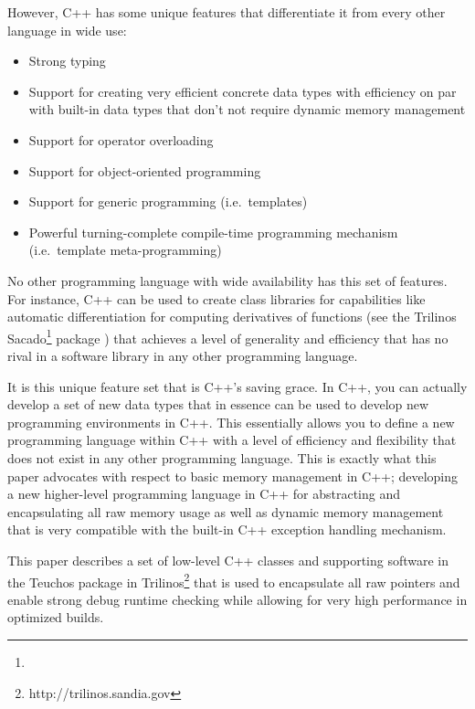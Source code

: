 \documentclass[pdf,ps2pdf,11pt]{SANDreport}
\begin{document}
However, C++ has some unique features that differentiate it from every
other language in wide use:

\begin{itemize}

{}\item Strong typing

{}\item Support for creating very efficient concrete data types with
efficiency on par with built-in data types that don't not require
dynamic memory management

{}\item Support for operator overloading

{}\item Support for object-oriented programming

{}\item Support for generic programming (i.e.\ templates)

{}\item Powerful turning-complete compile-time programming mechanism
(i.e.\ template meta-programming)

\end{itemize}

No other programming language with wide availability has this set of
features.  For instance, C++ can be used to create class libraries for
capabilities like automatic differentiation {}\cite{ref:ad} for
computing derivatives of functions (see the Trilinos
Sacado\footnote{}
package {}\cite{phippsEtAl2006}) that achieves a level of generality
and efficiency that has no rival in a software library in any other
programming language.

It is this unique feature set that is C++'s saving grace.  In C++, you
can actually develop a set of new data types that in essence can be
used to develop new programming environments in C++.  This essentially
allows you to define a new programming language within C++ with a
level of efficiency and flexibility that does not exist in any other
programming language.  This is exactly what this paper advocates
with respect to basic memory management in C++; developing a new
higher-level programming language in C++ for abstracting and
encapsulating all raw memory usage as well as dynamic memory
management that is very compatible with the built-in C++ exception
handling mechanism.

This paper describes a set of low-level C++ classes and supporting
software in the Teuchos package in
Trilinos\footnote{http://trilinos.sandia.gov} that is used to
encapsulate all raw pointers and enable strong debug runtime checking
while allowing for very high performance in optimized builds.
\end{document}
